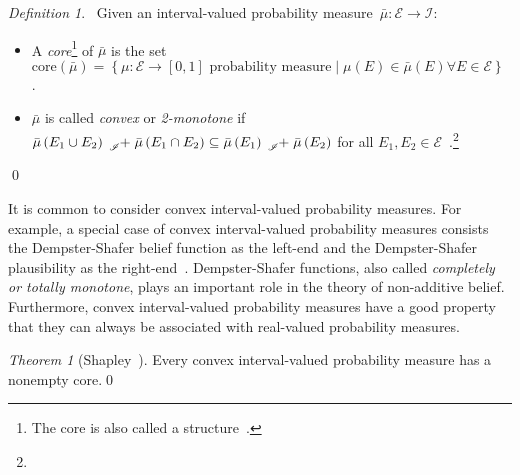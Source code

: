 \documentclass{article}
\theoremstyle{remark}
\newtheorem{definition}{Definition}
\newtheorem{thm}{Theorem}
\newcommand{\events}{\ensuremath{\mathcal{E}}}
\newcommand{\pmeas}{\ensuremath{\mu}}
\newcommand{\yutsung}[1]{\fbox{\begin{minipage}{0.9\textwidth}\color{purple}{Yu-Tsung says: #1}\end{minipage}}}
\begin{document}
\begin{definition}~Given an interval-valued probability measure~$\bar{\mu}:\events\rightarrow\mathscr{I}$:
\begin{itemize}
\item A \emph{core}\footnote{The core is also called a structure~\cite{Weichselberger2000}.}
of $\bar{\mu}$ is the set $\mathrm{core}\left(\bar{\mu}\right)=\left\{ \pmeas:\events\rightarrow[0,1]\textrm{ probability measure}\middle|\pmeas\left(E\right)\in\bar{\mu}\left(E\right)\forall E\in\events\right\} $
\cite{GilboaSchmeidler1994,Marinacci1999,Teran2014}.
\item $\bar{\mu}$ is called \emph{convex} or \emph{2-monotone} if $\bar{\mu}\left(E_{1}\cup E_{2}\right)\tensor*[_{\mathscr{I}}]{+}{}\bar{\mu}\left(E_{1}\cap E_{2}\right)\subseteq\bar{\mu}\left(E_{1}\right)\tensor*[_{\mathscr{I}}]{+}{}\bar{\mu}\left(E_{2}\right)$
for all $E_{1},E_{2}\in\events$~\cite{Shapley1965,GilboaSchmeidler1994,Marinacci1999,Teran2014}.\footnote{\yutsung{If we want to use convex, we need to explain the physical
meaning of convex interval-valued probability measures...? If there
is a good explanation, we may only consider convex interval-valued
probability measures, and replace the definition in the beginning...?}}
\end{itemize}
\qed\end{definition}

It is common to consider convex interval-valued probability measures.
For example, a special case of convex interval-valued probability
measures consists the Dempster-Shafer belief function as the left-end
and the Dempster-Shafer plausibility as the right-end~\cite{Dempster1967,Shafer1976,GilboaSchmeidler1994,Marinacci1999,Goodman2013,Teran2014}.
Dempster-Shafer functions, also called \emph{completely or totally
monotone}, plays an important role in the theory of non-additive belief.
Furthermore, convex interval-valued probability measures have a good
property that they can always be associated with real-valued probability
measures.

\begin{thm}[Shapley~\cite{Shapley1965,GilboaSchmeidler1994}]\label{thm:Shapley}
Every convex interval-valued probability measure has a nonempty core.\qed\end{thm}
\end{document}
